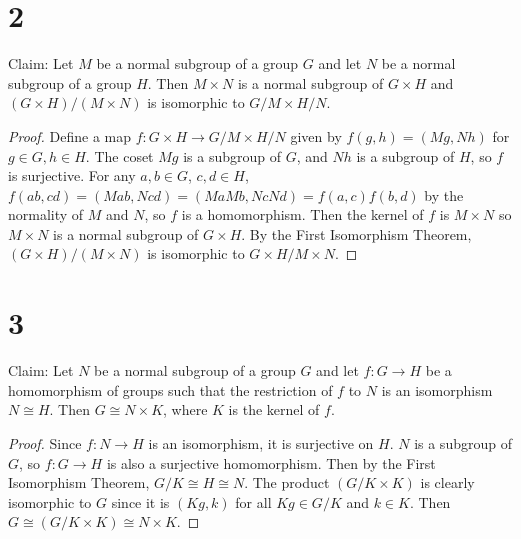 \documentclass{article}
\begin{document}
\section*{2}

Claim: Let $M$ be a normal subgroup of a group $G$ and let $N$ be a normal subgroup of a group 
$H$.  Then $M \times N$ is a normal subgroup of $G \times H$ and $ (G \times H)/(M \times N)$ 
is isomorphic to $G/M \times H/N$.  

\begin{proof}
    Define a map $f: G \times H \rightarrow G/M \times H/N$ given by $f(g, h) = (Mg, Nh)$ for 
    $g \in G, h \in H$. The coset $Mg$ is a subgroup of $G$, and $Nh$ is a subgroup of $H$, so $f$ is 
    surjective.  For any $a, b \in G$, $c, d \in H$, $f(ab, cd) = (Mab, Ncd) = (MaMb, NcNd) = f(a, c)f(b, d)$ 
    by the normality of $M$ and $N$, so $f$ is a homomorphism.  Then the 
    kernel of $f$ is $M \times N$ so $M \times N$ is a normal subgroup of $G \times H$. By the First Isomorphism Theorem, $(G \times H)/(M \times N)$ 
    is isomorphic to $G \times H/M \times N$.
\end{proof}

\section*{3}

Claim: Let $N$ be a normal subgroup of a group $G$ and let $f : G \rightarrow H$ be a 
homomorphism of groups such that the restriction of $f$ to $N$ is an isomorphism $N \cong H$.  
Then $G \cong N \times K$, where $K$ is the kernel of $f$.

\begin{proof}
    Since $f : N \rightarrow H$ is an isomorphism, it is surjective on $H$.  $N$ is a subgroup 
    of $G$, so $f : G \rightarrow H$ is also a surjective homomorphism.  Then by the First 
    Isomorphism Theorem, $G/K \cong H \cong N$.  The product $(G/K \times K)$ is clearly isomorphic to 
    $G$ since it is $(Kg, k)$ for all $Kg \in G/K$ and $k \in K$.  Then $G \cong (G/K \times K) \cong N \times K$.

\end{proof}
\end{document}

